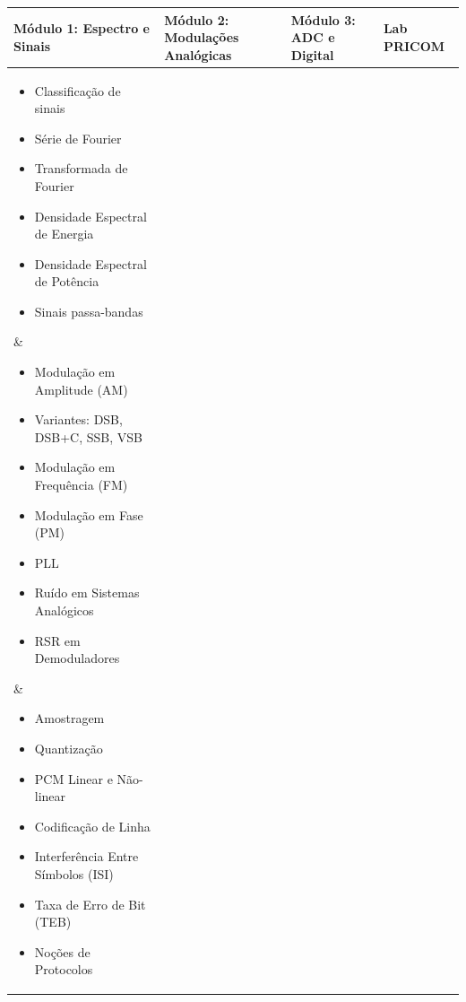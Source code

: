 \documentclass[11pt,a4paper]{article}
\begin{document}
\begin{center}
\small
\begin{tabular}{|p{}|p{}|p{}|p{}|}
\hline
\textbf{Módulo 1: Espectro e Sinais} & \textbf{Módulo 2: Modulações Analógicas} & \textbf{Módulo 3: ADC e Digital} & \textbf{Lab PRICOM} \\
\hline
\parbox[t]{0.20\textwidth}{%
  \vspace{0.2em}
  \begin{itemize}[noitemsep, leftmargin=*, nosep, font=\small]
    \item Classificação de sinais
    \item Série de Fourier
    \item Transformada de Fourier
    \item Densidade Espectral de Energia
    \item Densidade Espectral de Potência
    \item Sinais passa-bandas
  \end{itemize}
  \vspace{0.2em}
} &
\parbox[t]{0.20\textwidth}{%
  \vspace{0.2em}
  \begin{itemize}[noitemsep, leftmargin=*, nosep, font=\small]
    \item Modulação em Amplitude (AM)
    \item Variantes: DSB, DSB+C, SSB, VSB
    \item Modulação em Frequência (FM)
    \item Modulação em Fase (PM)
    \item PLL
    \item Ruído em Sistemas Analógicos
    \item RSR em Demoduladores
  \end{itemize}
  \vspace{0.2em}
} &
\parbox[t]{0.20\textwidth}{%
  \vspace{0.2em}
  \begin{itemize}[noitemsep, leftmargin=*, nosep, font=\small]
    \item Amostragem
    \item Quantização
    \item PCM Linear e Não-linear
    \item Codificação de Linha
    \item Interferência Entre Símbolos (ISI)
    \item Taxa de Erro de Bit (TEB)
    \item Noções de Protocolos

\end{itemize}}
\end{tabular}
\end{center}
\end{document}
